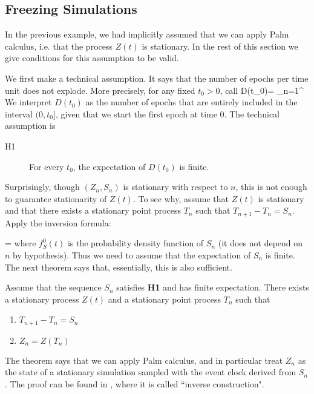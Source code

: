 \subsection{Freezing Simulations} In the previous example, we had implicitly assumed that
we can apply Palm calculus, i.e. that the process $Z(t)$ is
stationary. In the rest of this section we give conditions for
this assumption to be valid.

We first make a technical assumption. It says that the number of
epochs per time unit does not explode. More precisely, for any fixed
$t_0>0$, call
 \ben D(t_0)= \sum_{n=1}^{\infty} 
  \een
We interpret $D(t_0)$ as the number of epochs that are entirely
included in the interval $(0,t_0]$, given that we start the first
epoch at time $0$. The technical assumption is

\begin{description}
    \item[H1] For every $t_0$, the expectation of $D(t_0)$ is finite.
\end{description}

Surprisingly, though $(Z_n,S_n)$ is stationary with respect to $n$,
this is not enough to guarantee stationarity of $Z(t)$. To see why,
assume that $Z(t)$ is stationary and that there exists a stationary
point process $T_n$ such that $T_{n+1}-T_n= S_n$. Apply the
inversion formula:

\be
 \lambda = 
 \ee
 where $f^0_S(t)$ is the probability density function of $S_n$
 (it does not depend on $n$ by hypothesis). Thus we need to assume that the expectation of
 $S_n$ is finite. The next theorem says that, essentially,
 this is also sufficient.



\begin{shadethm}\label{thm:inversecontr}
Assume that the sequence $S_n$ satisfies \textbf{H1} and has finite
expectation. There exists a stationary process $Z(t)$ and a
stationary point process $T_n$ such that
\begin{enumerate}
    \item $T_{n+1}-T_n = S_n$
    \item $Z_n=Z(T_n)$
\end{enumerate}
\end{shadethm}
The theorem says that we can apply Palm calculus, and in particular
treat $Z_n$ as the state of a stationary simulation sampled with the
event clock derived from $S_n$. The proof can be found in
\cite{baccelli-87}, where it is called ``inverse construction".


